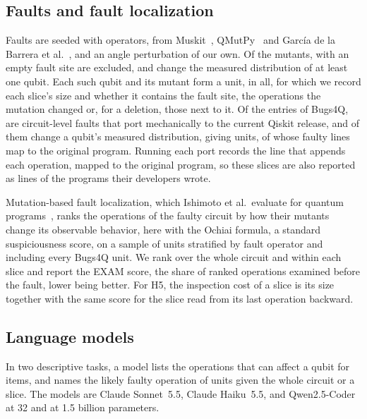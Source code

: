 \subsection{Faults and fault localization}
Faults are seeded with \numMutOperators{} operators, \numMutPublished{} from Muskit~\cite{mendiluze2021muskit},
QMutPy~\cite{fortunato2022qmutpy} and García de la Barrera et al.~\cite{garcia2022testing}, and an angle perturbation
of our own. Of the \numMutants{} mutants, \numMutantsExcluded{} with an empty fault site are excluded, and
\numMutantsKilled{} change the measured distribution of at least one qubit. Each such qubit and its mutant form a
unit, \numRqThreeUnits{} in all, for which we record each slice's size and whether it contains the fault site, the operations the mutation changed or, for a deletion,
those next to it. Of the
\numBugsFourQTriaged{} entries of Bugs4Q, \numBugsFourQIncluded{} are circuit-level faults that port mechanically to
the current Qiskit release, and \numBugsFourQKilled{} of them change a qubit's measured distribution, giving
\numBugsFourQUnits{} units, \numLinesUnits{} of whose faulty lines map to the original program. Running each port
records the line that appends each operation, mapped to the original program, so these slices are also reported as
lines of the programs their developers wrote.

Mutation-based fault localization, which Ishimoto et al.\ evaluate for quantum programs~\cite{ishimoto2025mbfl},
ranks the operations of the faulty circuit by how their mutants change its observable behavior, here with the Ochiai
formula, a standard suspiciousness score, on a sample of \numMbflUnits{} units stratified by fault operator and including every Bugs4Q unit. We rank over the whole
circuit and within each slice and report the EXAM score, the share of ranked operations examined before the fault,
lower being better. For H5, the inspection cost of a slice is its size together with the same score for the slice read
from its last operation backward.

\subsection{Language models}
In two descriptive tasks, a model lists the operations that can affect a qubit for \numTOneItems{} items, and
names the likely faulty operation of \numTTwoItems{} units given the whole circuit or a slice. The models are Claude
Sonnet~5.5, Claude Haiku~5.5, and Qwen2.5-Coder at 32 and at 1.5 billion parameters.

